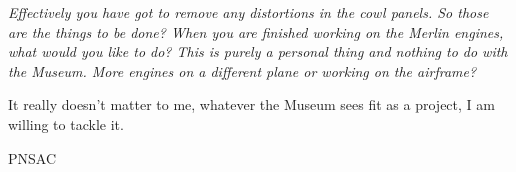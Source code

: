 \noindent\textit{Effectively you have got to remove any distortions in the cowl
panels. So those are the things to be done?  When you are finished working on
the Merlin engines, what would you like to do?  This is purely a personal thing
and nothing to do with the Museum.  More engines on a different plane or working
on the airframe?}

It really doesn't matter to me, whatever the Museum sees fit as a project, I am
willing to tackle it. 









%
%
%
%
%

\begin{footnotesize}
    \raggedleft PNSAC\\
\end{footnotesize}





